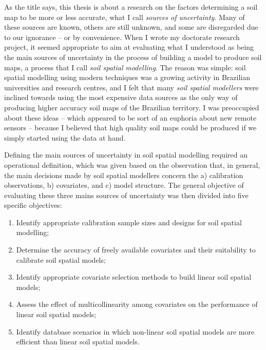 As the title says, this thesis is about a research on the factors determining a soil map to be more or less 
accurate, what I call \emph{sources of uncertainty}. Many of these sources are known, others are still unknown, 
and some are disregarded due to our ignorance -- or by convenience. When I wrote my doctorate research project, 
it seemed appropriate to aim at evaluating what I understood as being the main sources of uncertainty in the 
process of building a model to produce soil maps, a process that I call \emph{soil spatial modelling}. The 
reason was simple: soil spatial modelling using modern techniques was a growing activity in Brazilian 
universities and research centres, and I felt that many \emph{soil spatial modellers} were inclined towards 
using the most expensive data sources as the only way of producing higher accuracy soil maps of the Brazilian 
territory. I was preoccupied about these ideas -- which appeared to be sort of an euphoria about new remote 
sensors -- because I believed that high quality soil maps could be produced if we simply started using the data 
at hand.

Defining the main sources of uncertainty in soil spatial modelling required an operational definition, which 
was given based on the observation that, in general, the main decisions made by soil spatial modellers concern 
the a) calibration observations, b) covariates, and c) model structure. The general objective of evaluating 
these three mains sources of uncertainty was then divided into five specific objectives:

\begin{enumerate}[label=(\Roman*)]
\item Identify appropriate calibration sample sizes and designs for soil spatial modelling;

\item Determine the accuracy of freely available covariates and their suitability to calibrate soil spatial 
models;

\item Identify appropriate covariate selection methods to build linear soil spatial models;

\item Assess the effect of multicollinearity among covariates on the performance of linear soil spatial models;

\item Identify database scenarios in which non-linear soil spatial models are more efficient than linear soil 
spatial models.
\end{enumerate}


